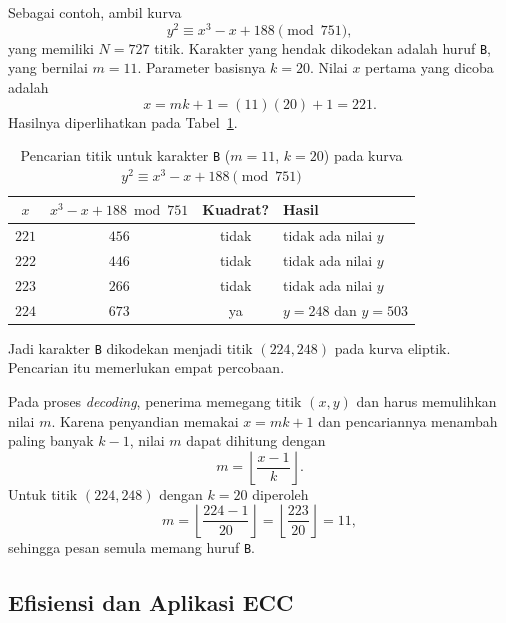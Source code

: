 Sebagai contoh, ambil kurva
\[
y^2 \equiv x^3 - x + 188 \pmod{751},
\]
yang memiliki $N = 727$ titik. Karakter yang hendak dikodekan adalah huruf
\texttt{B}, yang bernilai $m = 11$. Parameter basisnya $k = 20$. Nilai $x$
pertama yang dicoba adalah
\begin{equation}
x = mk + 1 = (11)(20) + 1 = 221 .
\label{eq:koblitz-x}
\end{equation}
Hasilnya diperlihatkan pada Tabel~\ref{tab:koblitz-b}.

\begin{table}[htbp]
    \centering
    \caption{Pencarian titik untuk karakter \texttt{B} ($m = 11$, $k = 20$)
    pada kurva $y^2 \equiv x^3 - x + 188 \pmod{751}$}
    \label{tab:koblitz-b}
    \begin{tabularx}{\linewidth}{@{}c c c
                                   >{\raggedright\arraybackslash}X@{}}
    \toprule
    $x$ & $x^3 - x + 188 \bmod 751$ & \textbf{Kuadrat?} & \textbf{Hasil} \\
    \midrule
    $221$ & $456$ & tidak & tidak ada nilai $y$ \\
    \addlinespace
    $222$ & $446$ & tidak & tidak ada nilai $y$ \\
    \addlinespace
    $223$ & $266$ & tidak & tidak ada nilai $y$ \\
    \addlinespace
    $224$ & $673$ & ya    & $y = 248$ dan $y = 503$ \\
    \bottomrule
    \end{tabularx}
\end{table}

Jadi karakter \texttt{B} dikodekan menjadi titik $(224, 248)$ pada kurva
eliptik. Pencarian itu memerlukan empat percobaan.

Pada proses \emph{decoding}, penerima memegang titik $(x, y)$ dan harus
memulihkan nilai $m$. Karena penyandian memakai $x = mk + 1$ dan pencariannya
menambah paling banyak $k - 1$, nilai $m$ dapat dihitung dengan
\begin{equation}
m = \left\lfloor \frac{x - 1}{k} \right\rfloor .
\label{eq:koblitz-dekode}
\end{equation}
Untuk titik $(224, 248)$ dengan $k = 20$ diperoleh
\[
m = \left\lfloor \frac{224 - 1}{20} \right\rfloor
  = \left\lfloor \frac{223}{20} \right\rfloor = 11 ,
\]
sehingga pesan semula memang huruf \texttt{B}.

\subsection{Efisiensi dan Aplikasi ECC}
\label{subsec:efisiensi-ecc}

